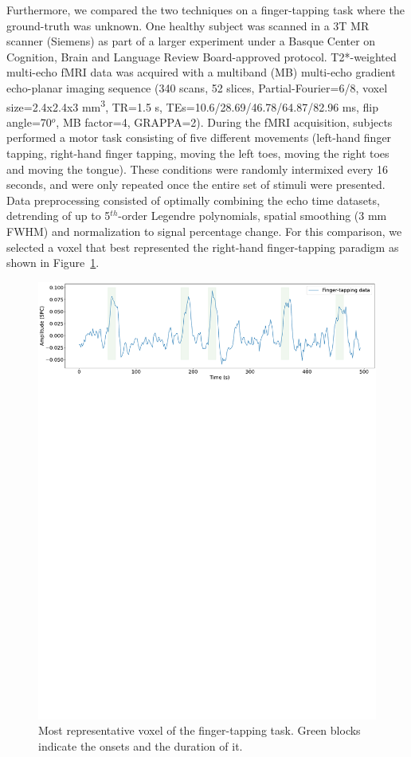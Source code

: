 Furthermore, we compared the two techniques on a finger-tapping task where the ground-truth was unknown. One healthy subject was scanned in a 3T MR scanner (Siemens) as part of a larger experiment under a Basque Center on Cognition, Brain and Language Review Board-approved protocol. T2*-weighted multi-echo fMRI data was acquired with a multiband (MB) multi-echo gradient echo-planar imaging sequence (340 scans, 52 slices, Partial-Fourier=6/8, voxel size=2.4x2.4x3 mm\textsuperscript{3}, TR=1.5 s, TEs=10.6/28.69/46.78/64.87/82.96 ms, flip angle=70\(^o\), MB factor=4, GRAPPA=2). During the fMRI acquisition, subjects performed a motor task consisting of five different movements (left-hand finger tapping, right-hand finger tapping, moving the left toes, moving the right toes and moving the tongue). These conditions were randomly intermixed every 16 seconds, and were only repeated once the entire set of stimuli were presented. Data preprocessing consisted of optimally combining the echo time datasets, detrending of up to 5\(^{th}\)-order Legendre polynomials, spatial smoothing (3 mm FWHM) and normalization to signal percentage change. For this comparison, we selected a voxel that best represented the right-hand finger-tapping paradigm as shown in Figure~\ref{fig:finger_tapping}.

\begin{figure}[h]
    \begin{center}
        \includegraphics[width=\columnwidth]{figures/finger_tapping.pdf}
    \end{center}
    \caption{Most representative voxel of the finger-tapping task. Green blocks indicate the onsets and the duration of it.}
\label{fig:finger_tapping}
\end{figure}


